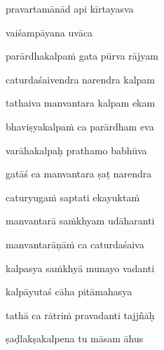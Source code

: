 \nemslokad 
pravartamānād api kīrtayasva \veg\dontdisplaylinenum

\vers

vaiśampāyana uvāca~{\dandab}\dontdisplaylinenum 

\nemsloka 
parārdhakalpa\.m gata pūrva rājyam
\dontdisplaylinenum

\nemslokab 
caturdaśaivendra narendra kalpam \danda\dontdisplaylinenum

\nemslokac 
tathaiva manvantara kalpam ekam
\dontdisplaylinenum

\nemslokad 
bhaviṣyakalpa\.m ca parārdham eva \veg\dontdisplaylinenum

\ujvers\nemsloka 
varāhakalpaḥ prathamo babhūva
\dontdisplaylinenum

\nemslokab 
gatāś ca manvantara ṣaṭ narendra \danda\dontdisplaylinenum

\nemslokac 
caturyuga\.m saptati ekayukta\.m
\dontdisplaylinenum

\nemslokad 
manvantarā sa\.mkhyam udāharanti \veg\dontdisplaylinenum

\ujvers\nemsloka 
manvantarāṇā\.m ca caturdaśaiva
\dontdisplaylinenum
            \var{\vo \om\ \Ed}%

\nemslokab 
kalpasya sa\.mkhyā munayo vadanti \danda\dontdisplaylinenum

\nemslokac 
kalpāyutaś cāha pitāmahasya
\dontdisplaylinenum

\nemslokad 
tathā ca rātri\.m pravadanti tajjñāḥ \veg\dontdisplaylinenum

\ujvers\nemsloka 
ṣaḍlakṣakalpena tu māsam āhus
\dontdisplaylinenum

